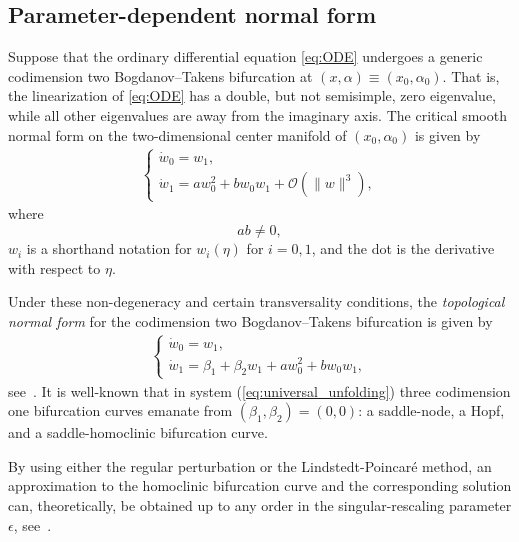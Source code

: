 \subsection{Parameter-dependent normal form}%
%
Suppose that the ordinary differential equation \cref{eq:ODE} undergoes a
generic codimension two Bogdanov--Takens bifurcation at $(x,\alpha) \equiv
(x_0,\alpha_0)$. That is, the linearization of \cref{eq:ODE} has a double, but
not semisimple, zero eigenvalue, while all other eigenvalues are away from the
imaginary axis. The critical smooth normal form on the two-dimensional center
manifold of $(x_0, \alpha_0)$ is given
by~\cite{Arnold_1983,guckenheimer1983nonlinear}
\begin{equation*}
\begin{aligned}
\begin{cases}
\dot w_0 = w_1, \\
\dot w_1 = a w_0^2 + b w_0 w_1 + \mathcal O(\|w\|^3),
\end{cases}
\end{aligned}
\end{equation*}
where 
\begin{equation*}
ab \neq 0,
\end{equation*}
$w_i$ is a shorthand notation for $w_i(\eta)$ for $i=0,1$, and the dot is
the derivative with respect to $\eta$.

Under these non-degeneracy and certain transversality conditions, the
\emph{topological normal form} for the codimension two Bogdanov--Takens
bifurcation is given by  
\begin{equation}
\label{eq:universal_unfolding}
\begin{aligned}
\begin{cases}
\dot w_0 = w_1, \\
\dot w_1 = \beta_1 + \beta_2 w_1 + a w_0^2 + b w_0 w_1,
\end{cases}
\end{aligned}
\end{equation}
see~\cite{bogdanov1975zeroEigenvalues,Bogdanov1976,Takens1974,guckenheimer1983nonlinear,Kuznetsov2004}. 
It is well-known that in system (\ref{eq:universal_unfolding}) three codimension one
bifurcation curves emanate from $(\beta_1,\beta_2)=(0,0)$: a saddle-node, a Hopf,
and a saddle-homoclinic bifurcation curve. 

By using either the regular perturbation or the Lindstedt-Poincar\'e method,
an approximation to the homoclinic bifurcation curve and the corresponding
solution can, theoretically, be obtained up to any order in the
singular-rescaling parameter $\epsilon$,
see~\cite{Kuznetsov2014improved,Gray-Scott2015, Al-Hdaibat2016, Algaba_2019}.

